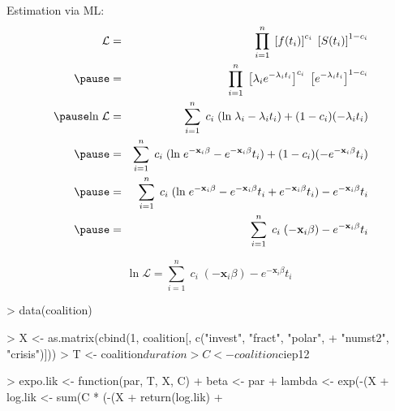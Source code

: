 \documentclass[handout]{beamer}
\begin{document}
\begin{frame}
Estimation via ML:
\pause
\begin{eqnarray*}
\mathcal{L} &=& \prod^n_{i=1} \; \left[ f(t_i) \right] ^
{c_i} \; \left[ S(t_i) \right] ^ {1 - c_i} \\  
\pause 
&=&  \prod^n_{i=1} \; \left[ \lambda_i e^{-\lambda_i t_i} \right] ^{c_i}
\; \left[ e^{-\lambda_i t_i} \right] ^ {1 - c_i}\\
\pause
\mathrm{ln} \; \mathcal{L} &=& \sum_{i=1}^n \; c_i \; (\mathrm{ln} \;
\lambda_i - \lambda_i t_i) + (1-c_i) (-\lambda_i t_i) \\
\pause
&=& \sum_{i=1}^n \; c_i \; (\mathrm{ln} \;
e^{-\mathbf{x}_i \beta} - e^{-\mathbf{x}_i \beta} t_i) + (1-c_i) (-e^{-\mathbf{x}_i \beta} t_i) \\
\pause
&=& \sum_{i=1}^n \; c_i \; (\mathrm{ln} \;
e^{-\mathbf{x}_i \beta} - e^{-\mathbf{x}_i \beta} t_i +
e^{-\mathbf{x}_i \beta} t_i) - e^{-\mathbf{x}_i \beta} t_i\\
\pause
&=& \sum_{i=1}^n \; c_i \; (-\mathbf{x}_i \beta) - e^{-\mathbf{x}_i \beta} t_i\\
\end{eqnarray*}
\end{frame}

\begin{frame}[fragile]
\begin{equation*}
\mathrm{ln} \; \mathcal{L} = \sum_{i=1}^n \; c_i \; (-\mathbf{x}_i \beta) - e^{-\mathbf{x}_i \beta} t_i
\end{equation*}
\pause
\tiny{
\begin{Schunk}
\begin{Sinput}
> data(coalition)
\end{Sinput}
\end{Schunk}
\begin{Schunk}
\begin{Sinput}
> X <- as.matrix(cbind(1, coalition[, c("invest", "fract", "polar", 
+     "numst2", "crisis")]))
> T <- coalition$duration
> C <- coalition$ciep12
\end{Sinput}
\end{Schunk}
\pause
\begin{Schunk}
\begin{Sinput}
> expo.lik <- function(par, T, X, C) {
+     beta <- par
+     lambda <- exp(-(X %
+     log.lik <- sum(C * (-(X %
+     return(log.lik)
+ }
\end{Sinput}
\end{Schunk}
\pause
\begin{Schunk}
\end{Schunk}
}
\end{frame}
\end{document}
